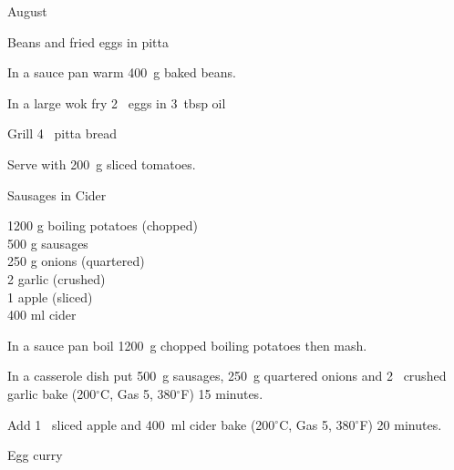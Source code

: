 \begin{menu}{August}
\begin{recipe}{1}{Beans and fried eggs in pitta}
\begin{ingredients}
		\end{ingredients}
	
    \begin{instructions}
    \item 
        In a sauce pan warm
        400~g  baked beans.
      \item 
        In a large wok fry
        2~  eggs
        in
        3~tbsp  oil\item 
        Grill
        4~  pitta bread\item 
        Serve with 200~g sliced tomatoes.
      
    \end{instructions}
    \end{recipe}%
  
    \begin{recipe}{2}{Sausages in Cider}%
    
		\begin{ingredients}
		1200 g boiling potatoes (chopped) \\
	500 g sausages  \\
	250 g onions (quartered) \\
	2  garlic (crushed) \\
	1  apple (sliced) \\
	400 ml cider  \\
	
		\end{ingredients}
	
    \begin{instructions}
    \item 
        In a sauce pan boil
        1200~g chopped boiling potatoes
        then mash.
      \item 
        In a casserole dish put
        500~g  sausages,
        250~g quartered onions
        and
        2~ crushed garlic
        bake 
      (200$^{\circ}$C, Gas 5, 380$^{\circ}$F)
     15 minutes.
      \item 
        Add 1~ sliced apple
        and
        400~ml  cider
        bake 
      (200$^{\circ}$C, Gas 5, 380$^{\circ}$F)
     20 minutes.
      
    \end{instructions}
    \end{recipe}%
  
    \begin{recipe}{2}{Egg curry}%
    

\end{recipe}
\end{menu}
